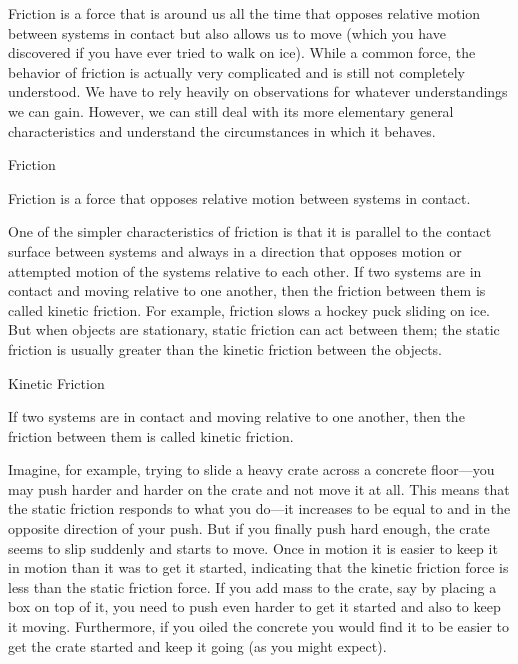\documentclass[
]{book}
\newenvironment{note}{}{}
\begin{document}
\protect\hypertarget{import-auto-id1165298484489}{}{Friction} is a force
that is around us all the time that opposes relative motion between
systems in contact but also allows us to move (which you have discovered
if you have ever tried to walk on ice). While a common force, the
behavior of friction is actually very complicated and is still not
completely understood. We have to rely heavily on observations for
whatever understandings we can gain. However, we can still deal with its
more elementary general characteristics and understand the circumstances
in which it behaves.

\hypertarget{fs-id1737207}{}
\begin{note}

Friction

Friction is a force that opposes relative motion between systems in
contact.

\end{note}

One of the simpler characteristics of friction is that it is parallel to
the contact surface between systems and always in a direction that
opposes motion or attempted motion of the systems relative to each
other. If two systems are in contact and moving relative to one another,
then the friction between them is called \protect\hypertarget{import-auto-id1165296294917}{}{kinetic
friction}. For example,
friction slows a hockey puck sliding on ice. But when objects are
stationary, \protect\hypertarget{import-auto-id1165298806829}{}{static friction}\textbf{} can act between
them; the static friction is usually greater than the kinetic friction
between the objects.

\hypertarget{fs-id1529028}{}
\begin{note}

Kinetic Friction

If two systems are in contact and moving relative to one another, then
the friction between them is called kinetic friction.

\end{note}

Imagine, for example, trying to slide a heavy crate across a concrete
floor---you may push harder and harder on the crate and not move it at
all. This means that the static friction responds to what you do---it
increases to be equal to and in the opposite direction of your push. But
if you finally push hard enough, the crate seems to slip suddenly and
starts to move. Once in motion it is easier to keep it in motion than it
was to get it started, indicating that the kinetic friction force is
less than the static friction force. If you add mass to the crate, say
by placing a box on top of it, you need to push even harder to get it
started and also to keep it moving. Furthermore, if you oiled the
concrete you would find it to be easier to get the crate started and
keep it going (as you might expect).
\end{document}
